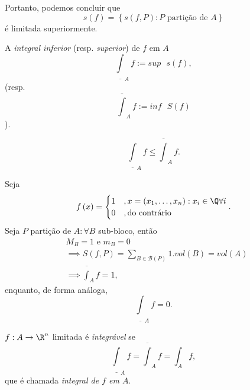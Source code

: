 Portanto, podemos concluir que \[
s\left( f \right) = \left\{ s\left( f,P \right) : P \text{ partição de }A \right\} 
\] é limitada superiormente.

\begin{definition}
    A \emph{integral inferior} (resp. \emph{superior}) de $f$ em $A$ \[
	\underline{\int}_A f := sup\text{ }s\left( f \right) 
,\] (resp. \[
	\overline{\int}_A f := inf\text{ }S\left( f \right) 
    \]).
\end{definition}

\begin{observe}
    \[
    \underline{\int}_A f \le  \overline{\int}_A f
    .\] 
\end{observe}

\begin{eg}
    Seja \[
    f\left( x \right) = \begin{cases}
	1 &, x=\left( x_1,\ldots,x_n \right) : x_i\in \Q \forall i \\
	0 &, \text{do contrário}
    \end{cases}
    .\]
    Seja $P$ partição de $A:\forall B $ sub-bloco, então
    \begin{align*}
	& M_B = 1 \text{ e }m_B=0 \\
	&\implies S\left( f, P \right) = \sum_{B\in \mathcal{B}\left( P \right) } 1 . vol\left( B \right)= vol \left( A \right) \\
	&\implies \overline{\int}_A f = 1
    ,\end{align*}
    enquanto, de forma análoga, \[
    \underline{\int}_A f = 0
    .\] 
\end{eg}

\begin{definition}
    $f:A\to \R^{n}$ limitada é \emph{integrável} se \[
	\underline{\int}_A f = \overline{\int}_A f = \int_A f
    ,\] que é chamada \emph{integral de $f$ em $A$}.
\end{definition}

